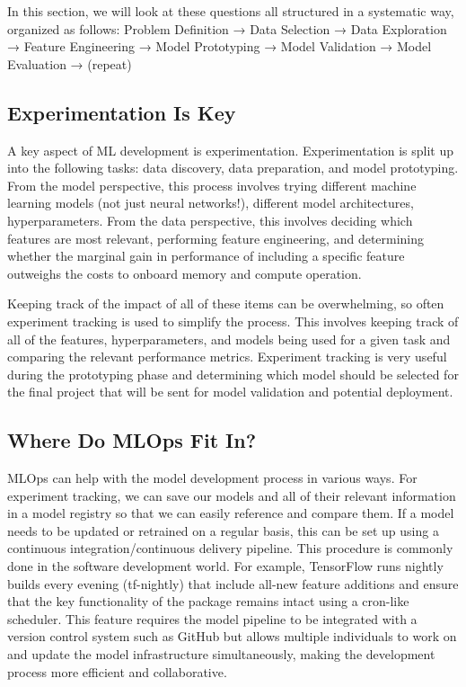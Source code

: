     In this section, we will look at these questions all structured in a systematic way, organized as follows: Problem Definition → Data Selection → Data Exploration → Feature Engineering → Model Prototyping → Model Validation → Model Evaluation → (repeat)
    
\subsection{Experimentation Is Key}

    A key aspect of ML development is experimentation. Experimentation is split up into the following tasks: data discovery, data preparation, and model prototyping. From the model perspective, this process involves trying different machine learning models (not just neural networks!), different model architectures, hyperparameters. From the data perspective, this involves deciding which features are most relevant, performing feature engineering, and determining whether the marginal gain in performance of including a specific feature outweighs the costs to onboard memory and compute operation.
    
    Keeping track of the impact of all of these items can be overwhelming, so often experiment tracking is used to simplify the process. This involves keeping track of all of the features, hyperparameters, and models being used for a given task and comparing the relevant performance metrics. Experiment tracking is very useful during the prototyping phase and determining which model should be selected for the final project that will be sent for model validation and potential deployment.
    
\subsection{Where Do MLOps Fit In?}

    MLOps can help with the model development process in various ways. For experiment tracking, we can save our models and all of their relevant information in a model registry so that we can easily reference and compare them. If a model needs to be updated or retrained on a regular basis, this can be set up using a continuous integration/continuous delivery pipeline. This procedure is commonly done in the software development world. For example, TensorFlow runs nightly builds every evening (tf-nightly) that include all-new feature additions and ensure that the key functionality of the package remains intact using a cron-like scheduler. This feature requires the model pipeline to be integrated with a version control system such as GitHub but allows multiple individuals to work on and update the model infrastructure simultaneously, making the development process more efficient and collaborative.
    
